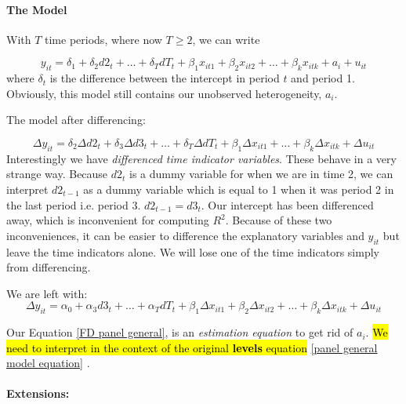 \documentclass[11pt]{article}
\begin{document}
\begin{mdframed}
    \paragraph{The Model} \mbox{}

    With $T$ time periods, where now $T\geq2$, we can write

    \begin{equation}
    \label{panel general model equation}
y_{i t}=\delta_1+\delta_2 d 2_t+\ldots+\delta_T d T_t+\beta_1 x_{i t 1}+\beta_2 x_{i t 2}+\ldots+\beta_k x_{i t k}+a_i+u_{i t}
\end{equation}
where $\delta_t$ is the difference between the intercept in period $t$ and period 1. Obviously, this model still contains our unobserved heterogeneity, $a_i$.


The model after differencing:

\begin{equation}
    \Delta y_{it} = \delta_2 \Delta d2_t + \delta_3 \Delta d3_t + \ldots + \delta_T \Delta dT_t + \beta_1 \Delta x_{it1} + \ldots + \beta_k \Delta x_{itk} + \Delta u_{it}
\end{equation}
Interestingly we have \textit{differenced time indicator variables}. These behave in a very strange way. Because $d2_t$ is a dummy variable for when we are in time 2, we can interpret $d2_{t-1}$ as a dummy variable which is equal to 1 when it was period 2 in the last period i.e. period 3. $d2_{t-1} = d3_t$. Our intercept has been differenced away, which is inconvenient for computing $R^2$. Because of these two inconveniences, it can be easier to difference the explanatory variables and $y_{it}$ but leave the time indicators alone. We will lose one of the time indicators simply from differencing. 

We are left with:
\begin{equation}
\label{FD panel general}
\Delta y_{i t}=\alpha_0+\alpha_3 d 3_t+\ldots+\alpha_T d T_t+\beta_1 \Delta x_{i t 1}+\beta_2 \Delta x_{i t 2}+\ldots+\beta_k \Delta x_{i t k}+\Delta u_{i t}
\end{equation}

\end{mdframed}

Our Equation \eqref{FD panel general}, is an \textit{estimation equation} to get rid of $a_i$. \hl{We need to interpret in the context of the original \textbf{levels} equation} \eqref{panel general model equation} . 

\paragraph{Extensions:} \mbox{}
\end{document}
